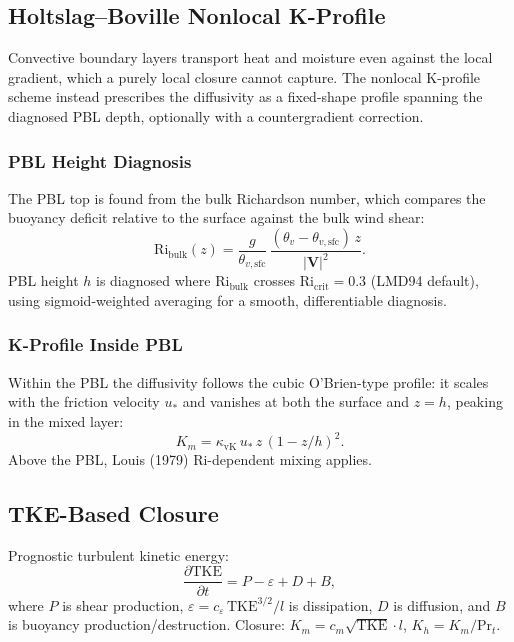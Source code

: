 \documentclass[11pt,twoside]{report}
\newcommand{\pp}{\partial}
\newcommand{\vect}[1]{\bm{#1}}
\begin{document}
\subsection{Holtslag--Boville Nonlocal K-Profile}

Convective boundary layers transport heat and moisture even against the local
gradient, which a purely local closure cannot capture. The nonlocal
K-profile scheme \citep{HoltslagBoville1993} instead prescribes the
diffusivity as a fixed-shape profile spanning the diagnosed PBL depth,
optionally with a countergradient correction.

\subsubsection{PBL Height Diagnosis}

The PBL top is found from the bulk Richardson number, which compares the
buoyancy deficit relative to the surface against the bulk wind shear:
\begin{equation}
  \mathrm{Ri}_{\mathrm{bulk}}(z) = \frac{g}{\theta_{v,\mathrm{sfc}}}\,
  \frac{(\theta_v-\theta_{v,\mathrm{sfc}})\,z}{|\vect{V}|^2}.
\end{equation}
PBL height $h$ is diagnosed where $\mathrm{Ri}_{\mathrm{bulk}}$
crosses $\mathrm{Ri}_{\mathrm{crit}}=0.3$ (LMD94 default), using
sigmoid-weighted averaging for a smooth, differentiable diagnosis.

\subsubsection{K-Profile Inside PBL}

Within the PBL the diffusivity follows the cubic O'Brien-type profile: it
scales with the friction velocity $u_*$ and vanishes at both the surface and
$z=h$, peaking in the mixed layer:
\begin{equation}
  K_m = \kappa_{\mathrm{vK}}\,u_*\,z\,(1-z/h)^2.
\end{equation}
Above the PBL, Louis (1979) Ri-dependent mixing applies.

\subsection{TKE-Based Closure}

Prognostic turbulent kinetic energy:
\begin{equation}
  \frac{\pp\mathrm{TKE}}{\pp t} = P - \varepsilon + D + B,
\end{equation}
where $P$ is shear production, $\varepsilon=c_\varepsilon\,\mathrm{TKE}^{3/2}/l$
is dissipation, $D$ is diffusion, and $B$ is buoyancy production/destruction.
Closure: $K_m = c_m\sqrt{\mathrm{TKE}}\cdot l$, $K_h = K_m/\mathrm{Pr}_t$.
\end{document}
